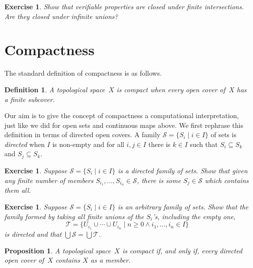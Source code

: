 \documentclass[a4paper,10pt]{article}
\newtheorem{proposition}[theorem]{Proposition}
\newtheorem{exercise}[theorem]{Exercise}
\newtheorem{definition}[theorem]{Definition}
\newcommand{\set}[1]{\{#1\}}
\newcommand{\such}{\mid}
\begin{document}
\begin{exercise}
  Show that verifiable properties are closed under finite
  intersections. Are they closed under infinite unions?
\end{exercise}

\section{Compactness}
\label{sec:compactness}

The standard definition of compactness is as follows.

\begin{definition}
  A topological space~$X$ is \emph{compact} when every open cover
  of~$X$ has a finite subcover.
\end{definition}

Our aim is to give the concept of compactness a computational
interpretation, just like we did for open sets and continuous maps
above. We first rephrase this definition in terms of directed open
covers. A family $\mathcal{S} = \set{S_i \such i \in I}$ of sets is
\emph{directed} when $I$ is non-empty and for all $i, j \in I$ there
is $k \in I$ such that $S_i \subseteq S_k$ and $S_j \subseteq S_k$.

\begin{exercise}
  Suppose $\mathcal{S} = \set{S_i \such i \in I}$ is a directed family
  of sets. Show that given any finite number of members $S_{i_1},
  \ldots, S_{i_n} \in \mathcal{S}$, there is some $S_j \in
  \mathcal{S}$ which contains them all.
\end{exercise}

\begin{exercise}
  Suppose $\mathcal{S} = \set{S_i \such i \in I}$ is an arbitrary
  family of sets. Show that the family formed by taking all finite
  unions of the $S_i$'s, including the empty one,
  \begin{equation*}
    \mathcal{T} = \set{U_{i_1} \cup \cdots \cup U_{i_n} \such
      n \geq 0 \land i_1, \ldots, i_n \in I}
  \end{equation*}
  is directed and that $\bigcup \mathcal{S} = \bigcup \mathcal{T}$.
\end{exercise}


\begin{proposition}
  \label{proposition:compact-directed-cover}
  A topological space~$X$ is \emph{compact} if, and only if, every
  directed open cover of~$X$ contains $X$ as a member.
\end{proposition}
\end{document}
